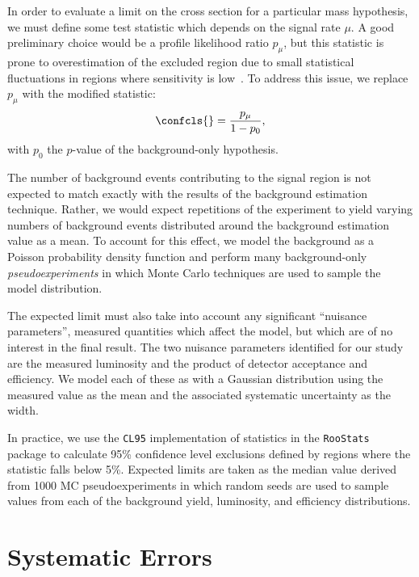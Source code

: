 In order to evaluate a limit on the cross section for a particular mass hypothesis, we must define some test statistic which depends on the signal rate $\mu$.  A good preliminary choice would be a profile likelihood ratio $p_\mu$, but this statistic is prone to overestimation of the excluded region due to small statistical fluctuations in regions where sensitivity is low~\cite{Nakamura:2010zzi}.  To address this issue, we replace $p_\mu$ with the modified statistic:
\begin{equation}
  \confcls{} = \frac{p_\mu}{1 - p_{0}},
\end{equation}
with $p_0$ the $p$-value of the background-only hypothesis.

The number of background events contributing to the signal region is not expected to match exactly with the results of the background estimation technique.  Rather, we would expect repetitions of the experiment to yield varying numbers of background events distributed around the background estimation value as a mean.  To account for this effect, we model the background as a Poisson probability density function and perform many background-only \emph{pseudoexperiments} in which Monte Carlo techniques are used to sample the model distribution.

The expected limit must also take into account any significant ``nuisance parameters'', measured quantities which affect the model, but which are of no interest in the final result.  The two nuisance parameters identified for our study are the measured luminosity and the product of detector acceptance and efficiency.  We model each of these as with a Gaussian distribution using the measured value as the mean and the associated systematic uncertainty as the width.  

In practice, we use the \texttt{CL95} implementation of \confcls{} statistics in the \texttt{RooStats}~\cite{roostats} package to calculate 95\% confidence level exclusions defined by regions where the \confcls{} statistic falls below 5\%.  Expected limits are taken as the median value derived from 1000 MC pseudoexperiments in which random seeds are used to sample values from each of the background yield, luminosity, and efficiency distributions.

\section{Systematic Errors}

